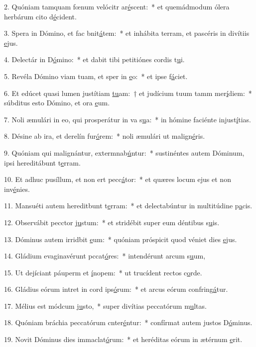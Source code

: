 2. Quóniam tamquam fœnum velócitr ar\uline{é}scent:~* et quemádmodum ólera herbárum cito d\uline{é}cident.\par 
3. Spera in Dómino, et fac bnit\uline{á}tem:~* et inhábita terram, et pascéris in divítiis \uline{e}jus.\par 
4. Delectár in D\uline{ó}mino:~* et dabit tibi petitiónes cordis t\uline{u}i.\par 
5. Revéla Dómino viam tuam, et sper in \uline{e}o:~* et ipse f\uline{á}ciet.\par 
6. Et edúcet quasi lumen justítiam \uline{tu}am:~† et judícium tuum tamm mer\uline{í}diem:~* súbditus esto Dómino, et ora \uline{e}um.\par 
7. Noli æmulári in eo, qui prosperátur in va s\uline{u}a:~* in hómine faciénte injust\uline{í}tias.\par 
8. Désine ab ira, et derelín fur\uline{ó}rem:~* noli æmulári ut malign\uline{é}ris.\par 
9. Quóniam qui malignántur, extermnab\uline{ú}ntur:~* sustinéntes autem Dóminum, ipsi hereditábunt t\uline{e}rram.\par 
10. Et adhuc pusíllum, et non ert pecc\uline{á}tor:~* et quæres locum ejus et non inv\uline{é}nies.\par 
11. Mansuéti autem hereditbunt t\uline{e}rram:~* et delectabúntur in multitúdine p\uline{a}cis.\par 
12. Observábit pecctor j\uline{u}stum:~* et stridébit super eum déntibus s\uline{u}is.\par 
13. Dóminus autem irridbit \uline{e}um:~* quóniam próspicit quod véniet dies \uline{e}jus.\par 
14. Gládium evaginavérunt pccat\uline{ó}res:~* intendérunt arcum s\uline{u}um,\par 
15. Ut dejíciant páuperm et \uline{í}nopem:~* ut trucídent rectos c\uline{o}rde.\par 
16. Gládius eórum intret in cord ips\uline{ó}rum:~* et arcus eórum confring\uline{á}tur.\par 
17. Mélius est módcum j\uline{u}sto,~* super divítias peccatórum m\uline{u}ltas.\par 
18. Quóniam bráchia peccatórum cnter\uline{é}ntur:~* confírmat autem justos D\uline{ó}minus.\par 
19. Novit Dóminus dies immaclat\uline{ó}rum:~* et heréditas eórum in ætérnum \uline{e}rit.\par 
